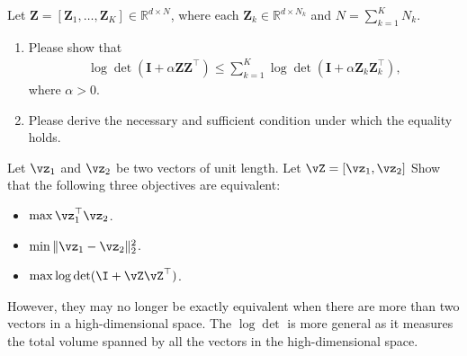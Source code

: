 \documentclass[../../book-main.tex]{subfiles}
\begin{document}

\begin{exercise}
    Let $\bm Z = [\bm Z_1, \dots, \bm Z_K] \in \mathbb{R}^{d \times N}$,
    where each $\bm Z_k \in \mathbb{R}^{d \times N_k}$ and
    $N = \sum_{k=1}^K N_k$.

    \begin{enumerate}
        \item Please show that
            \begin{align*}
                \log\det\left( \bm I + \alpha \bm Z \bm Z^\top \right)
                \le
                \sum_{k=1}^K
                \log\det\left( \bm I + \alpha \bm Z_k \bm Z_k^\top \right),
            \end{align*}
            where $\alpha > 0$.

        \item Please derive the necessary and sufficient condition
            under which the equality holds.
    \end{enumerate}

\end{exercise}

\begin{exercise}
    Let $\vz_1$ and $\vz_2$ be two vectors of unit length. Let
    $\vZ = [\vz_1,
    \vz_2]$ Show that the following three objectives are equivalent:
    \begin{itemize}
        \item $\max \vz_1^\top \vz_2$.
        \item $\min \|\vz_1 - \vz_2\|_2^2$.
        \item $\max \log \det (\I + \vZ\vZ^\top)$.
    \end{itemize}
    However, they may no longer be exactly equivalent when there are more
    than two vectors in a high-dimensional space. The $\log\det$ is more
    general as it measures the total volume spanned by all the vectors in
    the high-dimensional space.
\end{exercise}
\end{document}
